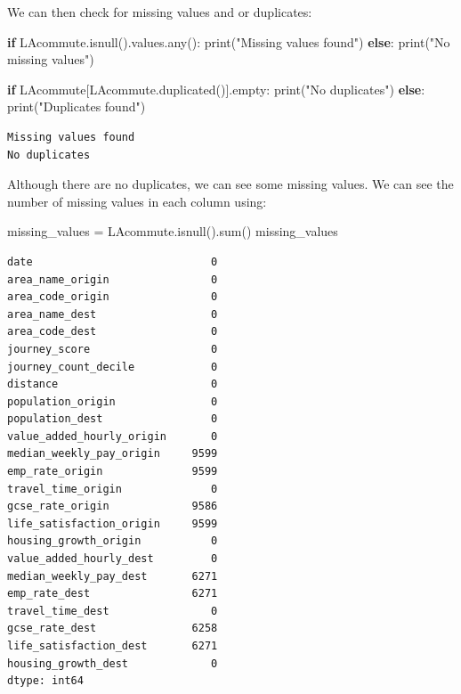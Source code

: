 \documentclass[
  number]{elsarticle}
\newenvironment{Shaded}{\begin{snugshade}}{\end{snugshade}}
\newcommand{\BuiltInTok}[1]{\textcolor[rgb]{0.00,0.23,0.31}{#1}}
\newcommand{\ControlFlowTok}[1]{\textcolor[rgb]{0.00,0.23,0.31}{\textbf{#1}}}
\newcommand{\NormalTok}[1]{\textcolor[rgb]{0.00,0.23,0.31}{#1}}
\newcommand{\OperatorTok}[1]{\textcolor[rgb]{0.37,0.37,0.37}{#1}}
\newcommand{\StringTok}[1]{\textcolor[rgb]{0.13,0.47,0.30}{#1}}
\begin{document}
We can then check for missing values and or duplicates:

\begin{Shaded}
\begin{Highlighting}[]
\ControlFlowTok{if}\NormalTok{ LAcommute.isnull().values.}\BuiltInTok{any}\NormalTok{():}
    \BuiltInTok{print}\NormalTok{(}\StringTok{"Missing values found"}\NormalTok{)}
\ControlFlowTok{else}\NormalTok{:}
    \BuiltInTok{print}\NormalTok{(}\StringTok{"No missing values"}\NormalTok{)}

\ControlFlowTok{if}\NormalTok{ LAcommute[LAcommute.duplicated()].empty:}
    \BuiltInTok{print}\NormalTok{(}\StringTok{"No duplicates"}\NormalTok{)}
\ControlFlowTok{else}\NormalTok{:}
    \BuiltInTok{print}\NormalTok{(}\StringTok{"Duplicates found"}\NormalTok{)}
\end{Highlighting}
\end{Shaded}

\begin{verbatim}
Missing values found
No duplicates
\end{verbatim}

Although there are no duplicates, we can see some missing values. We can
see the number of missing values in each column using:

\begin{Shaded}
\begin{Highlighting}[]
\NormalTok{missing\_values }\OperatorTok{=}\NormalTok{ LAcommute.isnull().}\BuiltInTok{sum}\NormalTok{()}
\NormalTok{missing\_values}
\end{Highlighting}
\end{Shaded}

\begin{verbatim}
date                            0
area_name_origin                0
area_code_origin                0
area_name_dest                  0
area_code_dest                  0
journey_score                   0
journey_count_decile            0
distance                        0
population_origin               0
population_dest                 0
value_added_hourly_origin       0
median_weekly_pay_origin     9599
emp_rate_origin              9599
travel_time_origin              0
gcse_rate_origin             9586
life_satisfaction_origin     9599
housing_growth_origin           0
value_added_hourly_dest         0
median_weekly_pay_dest       6271
emp_rate_dest                6271
travel_time_dest                0
gcse_rate_dest               6258
life_satisfaction_dest       6271
housing_growth_dest             0
dtype: int64
\end{verbatim}
\end{document}
